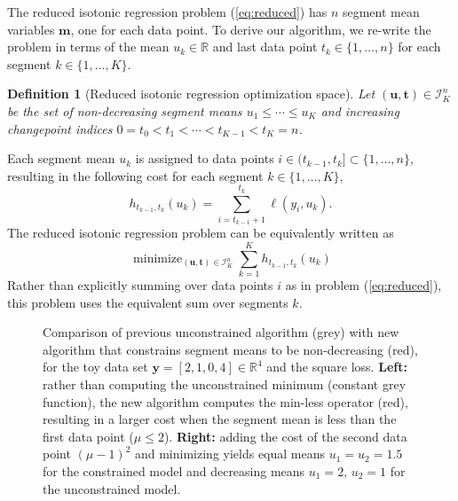 \documentclass{article}
\newtheorem{definition}{Definition}
\DeclareMathOperator*{\minimize}{minimize}
\newcommand{\RR}{\mathbb R}
\begin{document}
The reduced isotonic regression problem (\ref{eq:reduced}) has $n$
segment mean variables $\mathbf m$, one for each data point. To derive
our algorithm, we re-write the problem in terms of the mean
$ u_k\in\RR$ and last data point $t_k\in\{1,\dots,n\}$ for each
segment $k\in\{1,\dots, K\}$.
\begin{definition}[Reduced isotonic regression optimization space]
\label{def:Ibar}
  Let $(\mathbf u, \mathbf t)\in{\mathcal I}^n_K$ be the set of
  non-decreasing segment means $u_1\leq\cdots\leq u_K$ and
  increasing changepoint indices $0=t_0<t_1<\cdots<t_{K-1}<t_K=n$.
\end{definition}
Each segment mean $u_k$ is assigned to data points
$i\in(t_{k-1},t_k]\subset\{1,\dots,n\}$, resulting in the following
cost for each segment $k\in\{1, \dots, K\}$, 
\begin{equation}
  \label{eq:h}
  h_{t_{k-1}, t_k}(u_k) = \sum_{i=t_{k-1}+1}^{t_k} \ell(y_i, u_k).
\end{equation}
The reduced isotonic regression problem can be equivalently written as
\begin{equation}
  \label{eq:isotonic_ut}
  \minimize_{(\mathbf u, \mathbf t)\in{\mathcal I}^n_K}
  \sum_{k=1}^K
  h_{t_{k-1}, t_k}(u_k)
\end{equation}
Rather than explicitly summing over data points $i$ as in problem
(\ref{eq:reduced}), this problem uses the equivalent sum over segments $k$. 

\begin{figure}[b!]
  \centering
  
  
  \vskip -0.5cm
  \caption{Comparison of previous unconstrained algorithm (grey) with
    new algorithm that constrains segment means to be non-decreasing (red),
    for the toy data set $\mathbf y= [ 2, 1, 0, 4 ] \in\RR^4$ and the
    square loss. \textbf{Left:} rather than computing the
    unconstrained minimum (constant grey function), the new algorithm
    computes the min-less operator (red), resulting in a larger cost
    when the segment mean is less than the first data point
    ($\mu\leq 2$). \textbf{Right:} adding the cost of the second data
    point $(\mu-1)^2$ and minimizing yields equal means
    $u_1=u_2=1.5$ for the constrained model and decreasing 
    means $u_1=2,\, u_2=1$ for the unconstrained model.}
  \label{fig:compare-unconstrained}
\end{figure}

\end{document}
